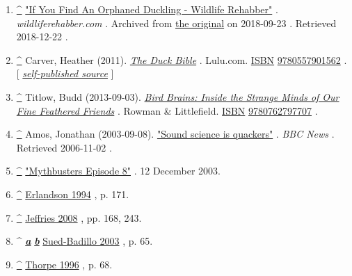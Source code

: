 \documentclass[11pt,a4paper]{article}
\begin{document}
\begin{enumerate}
\item \href{\#cite\_ref-28}{\textbf{\textasciicircum{}}} \href{https://web.archive.org/web/20180923152911/http://wildliferehabber.com/content/if-you-find-duckling}{"If You Find An Orphaned Duckling - Wildlife Rehabber"} . \textit{wildliferehabber.com} . Archived from \href{https://wildliferehabber.com/content/if-you-find-duckling}{the original} on 2018-09-23 . Retrieved 2018-12-22 .
\item \href{\#cite\_ref-29}{\textbf{\textasciicircum{}}} Carver, Heather (2011). \href{https://books.google.com/books?id=VGofAwAAQBAJ\&q=mallard+sound+deep+and+raspy\&pg=PA39}{\textit{The Duck Bible}} . Lulu.com. \href{/wiki/ISBN\_\%28identifier\%29}{ISBN} \href{/wiki/Special:BookSources/9780557901562}{9780557901562} . [ \href{/wiki/Wikipedia:Verifiability\#Self-published\_sources}{\textit{self-published source}} ]
\item \href{\#cite\_ref-30}{\textbf{\textasciicircum{}}} Titlow, Budd (2013-09-03). \href{https://books.google.com/books?id=fXJBBAAAQBAJ\&q=Females+of+most+dabbling+ducks+make+the+classic+\%22quack\%22+sound+but+most+ducks+don\%27t+quack\&pg=PA123}{\textit{Bird Brains: Inside the Strange Minds of Our Fine Feathered Friends}} . Rowman \& Littlefield. \href{/wiki/ISBN\_\%28identifier\%29}{ISBN} \href{/wiki/Special:BookSources/9780762797707}{9780762797707} .
\item \href{\#cite\_ref-31}{\textbf{\textasciicircum{}}} Amos, Jonathan (2003-09-08). \href{http://news.bbc.co.uk/2/hi/science/nature/3086890.stm}{"Sound science is quackers"} . \textit{BBC News} . Retrieved 2006-11-02 .
\item \href{\#cite\_ref-32}{\textbf{\textasciicircum{}}} \href{http://mythbustersresults.com/episode8}{"Mythbusters Episode 8"} . 12 December 2003.
\item \href{\#cite\_ref-FOOTNOTEErlandson1994171\_33-0}{\textbf{\textasciicircum{}}} \href{\#CITEREFErlandson1994}{Erlandson 1994} , p. 171.
\item \href{\#cite\_ref-FOOTNOTEJeffries2008168,\_243\_34-0}{\textbf{\textasciicircum{}}} \href{\#CITEREFJeffries2008}{Jeffries 2008} , pp. 168, 243.
\item \textasciicircum{} \href{\#cite\_ref-FOOTNOTESued-Badillo200365\_35-0}{\textit{\textbf{a}}} \href{\#cite\_ref-FOOTNOTESued-Badillo200365\_35-1}{\textit{\textbf{b}}} \href{\#CITEREFSued-Badillo2003}{Sued-Badillo 2003} , p. 65.
\item \href{\#cite\_ref-FOOTNOTEThorpe199668\_36-0}{\textbf{\textasciicircum{}}} \href{\#CITEREFThorpe1996}{Thorpe 1996} , p. 68.

\end{enumerate}
\end{document}
